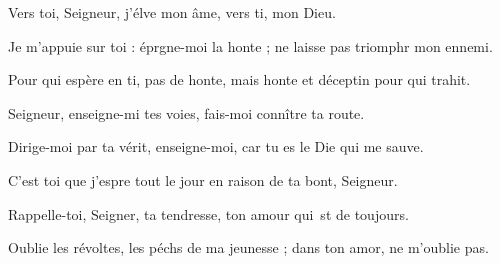 \item Vers toi, Seigneur, j’élve mon âme,\psstar{} vers ti, mon Dieu.
\item Je m’appuie sur toi : éprgne-moi la honte ;\psstar{} ne laisse pas triomphr mon ennemi.
\item Pour qui espère en ti, pas de honte,\psstar{} mais honte et déceptin pour qui trahit.
\item Seigneur, enseigne-mi tes voies,\psstar{} fais-moi connître ta route.
\item Dirige-moi par ta vérit, enseigne-moi,\psstar{} car tu es le Die qui me sauve.
\item C’est toi que j’espre tout le jour\psstar{} en raison de ta bont, Seigneur.
\item Rappelle-toi, Seigner, ta tendresse,\psstar{} ton amour qui st de toujours.
\item Oublie les révoltes, les péchs de ma jeunesse ;\psstar{} dans ton amor, ne m’oublie pas.